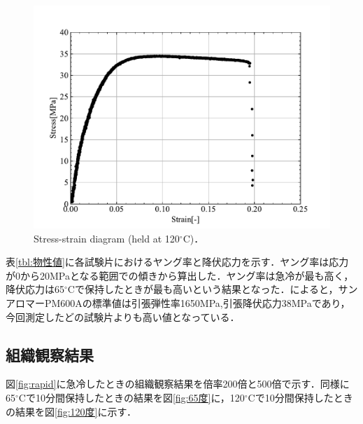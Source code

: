 \begin{figure}[htbp]
  \centering %
  \includegraphics[width=100truemm,clip]{fig/fig_SS-120.pdf}
  \caption{Stress-strain diagram (held at 120$^\circ$C)．}
  \label{fig:SS-120}
\end{figure}

表\ref{tbl:物性値}に各試験片におけるヤング率と降伏応力を示す．ヤング率は応力が0から20MPaとなる範囲での傾きから算出した．ヤング率は急冷が最も高く，降伏応力は65$^\circ$Cで保持したときが最も高いという結果となった．\cite{pm600A}によると，サンアロマーPM600Aの標準値は引張弾性率1650MPa,引張降伏応力38MPaであり，今回測定したどの試験片よりも高い値となっている．
\begin{table}[htbp]
  \centering
    \caption{Mechanical properties of each specimen.}
    \label{tbl:物性値}
\end{table}

\subsection{組織観察結果}
図\ref{fig:rapid}に急冷したときの組織観察結果を倍率200倍と500倍で示す．同様に65$^\circ$Cで10分間保持したときの結果を図\ref{fig:65度}に，120$^\circ$Cで10分間保持したときの結果を図\ref{fig:120度}に示す．

